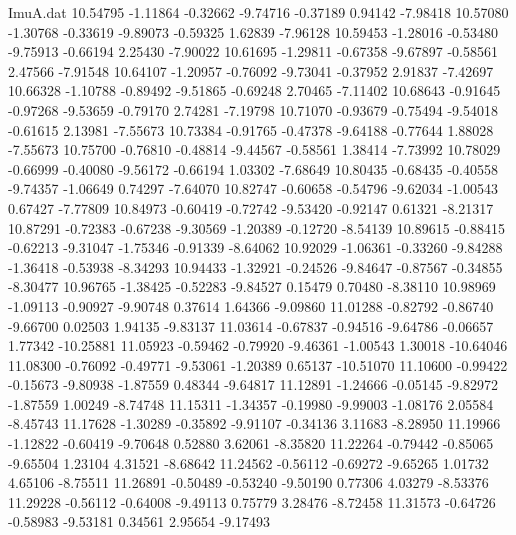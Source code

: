 \begin{filecontents}{ImuA.dat}
  10.54795   -1.11864   -0.32662   -9.74716   -0.37189    0.94142   -7.98418
  10.57080   -1.30768   -0.33619   -9.89073   -0.59325    1.62839   -7.96128
  10.59453   -1.28016   -0.53480   -9.75913   -0.66194    2.25430   -7.90022
  10.61695   -1.29811   -0.67358   -9.67897   -0.58561    2.47566   -7.91548
  10.64107   -1.20957   -0.76092   -9.73041   -0.37952    2.91837   -7.42697
  10.66328   -1.10788   -0.89492   -9.51865   -0.69248    2.70465   -7.11402
  10.68643   -0.91645   -0.97268   -9.53659   -0.79170    2.74281   -7.19798
  10.71070   -0.93679   -0.75494   -9.54018   -0.61615    2.13981   -7.55673
  10.73384   -0.91765   -0.47378   -9.64188   -0.77644    1.88028   -7.55673
  10.75700   -0.76810   -0.48814   -9.44567   -0.58561    1.38414   -7.73992
  10.78029   -0.66999   -0.40080   -9.56172   -0.66194    1.03302   -7.68649
  10.80435   -0.68435   -0.40558   -9.74357   -1.06649    0.74297   -7.64070
  10.82747   -0.60658   -0.54796   -9.62034   -1.00543    0.67427   -7.77809
  10.84973   -0.60419   -0.72742   -9.53420   -0.92147    0.61321   -8.21317
  10.87291   -0.72383   -0.67238   -9.30569   -1.20389   -0.12720   -8.54139
  10.89615   -0.88415   -0.62213   -9.31047   -1.75346   -0.91339   -8.64062
  10.92029   -1.06361   -0.33260   -9.84288   -1.36418   -0.53938   -8.34293
  10.94433   -1.32921   -0.24526   -9.84647   -0.87567   -0.34855   -8.30477
  10.96765   -1.38425   -0.52283   -9.84527    0.15479    0.70480   -8.38110
  10.98969   -1.09113   -0.90927   -9.90748    0.37614    1.64366   -9.09860
  11.01288   -0.82792   -0.86740   -9.66700    0.02503    1.94135   -9.83137
  11.03614   -0.67837   -0.94516   -9.64786   -0.06657    1.77342  -10.25881
  11.05923   -0.59462   -0.79920   -9.46361   -1.00543    1.30018  -10.64046
  11.08300   -0.76092   -0.49771   -9.53061   -1.20389    0.65137  -10.51070
  11.10600   -0.99422   -0.15673   -9.80938   -1.87559    0.48344   -9.64817
  11.12891   -1.24666   -0.05145   -9.82972   -1.87559    1.00249   -8.74748
  11.15311   -1.34357   -0.19980   -9.99003   -1.08176    2.05584   -8.45743
  11.17628   -1.30289   -0.35892   -9.91107   -0.34136    3.11683   -8.28950
  11.19966   -1.12822   -0.60419   -9.70648    0.52880    3.62061   -8.35820
  11.22264   -0.79442   -0.85065   -9.65504    1.23104    4.31521   -8.68642
  11.24562   -0.56112   -0.69272   -9.65265    1.01732    4.65106   -8.75511
  11.26891   -0.50489   -0.53240   -9.50190    0.77306    4.03279   -8.53376
  11.29228   -0.56112   -0.64008   -9.49113    0.75779    3.28476   -8.72458
  11.31573   -0.64726   -0.58983   -9.53181    0.34561    2.95654   -9.17493

\end{filecontents}
